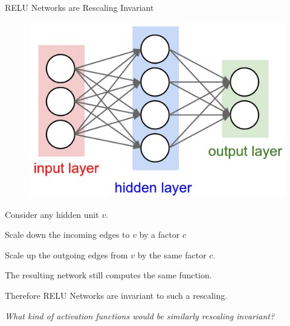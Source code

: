 \documentclass[presentation,xcolor={usenames,dvipsnames},10pt]{beamer}
\begin{document}
\begin{frame}{RELU Networks are Rescaling Invariant}

\begin{figure}
	\includegraphics[scale=0.2]{neural_net.jpeg}
\end{figure}


\bit 
\item Consider any hidden unit $v$.

\item Scale down the incoming edges to $v$ by a factor $c$

\item Scale up the outgoing edges from $v$ by the same factor $c$.

\item The resulting network still computes the same function. 

\item Therefore RELU Networks are invariant to such a rescaling. 

\eit
\textit{What kind of activation functions would be similarly rescaling invariant?} 
 
\end{frame} 
\end{document}
